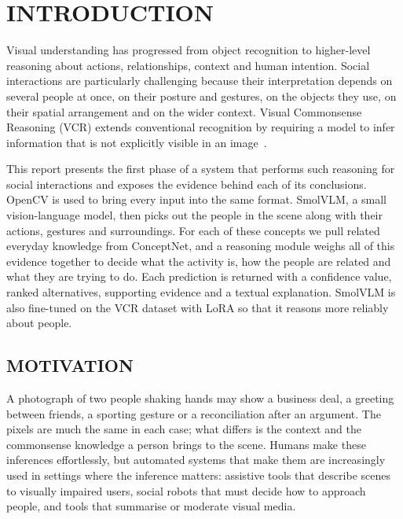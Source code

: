 
\chapter{INTRODUCTION} %
\label{ch:intro}

Visual understanding has progressed from object recognition to higher-level reasoning about actions, relationships, context and human intention. Social interactions are particularly challenging because their interpretation depends on several people at once, on their posture and gestures, on the objects they use, on their spatial arrangement and on the wider context. Visual Commonsense Reasoning (VCR) extends conventional recognition by requiring a model to infer information that is not explicitly visible in an image~\cite{zellers2019vcr}.

This report presents the first phase of a system that performs such reasoning for social interactions and exposes the evidence behind each of its conclusions. OpenCV is used to bring every input into the same format. SmolVLM, a small vision-language model, then picks out the people in the scene along with their actions, gestures and surroundings. For each of these concepts we pull related everyday knowledge from ConceptNet, and a reasoning module weighs all of this evidence together to decide what the activity is, how the people are related and what they are trying to do. Each prediction is returned with a confidence value, ranked alternatives, supporting evidence and a textual explanation. SmolVLM is also fine-tuned on the VCR dataset with LoRA so that it reasons more reliably about people.

\section{MOTIVATION}

A photograph of two people shaking hands may show a business deal, a greeting between friends, a sporting gesture or a reconciliation after an argument. The pixels are much the same in each case; what differs is the context and the commonsense knowledge a person brings to the scene. Humans make these inferences effortlessly, but automated systems that make them are increasingly used in settings where the inference matters: assistive tools that describe scenes to visually impaired users, social robots that must decide how to approach people, and tools that summarise or moderate visual media.

